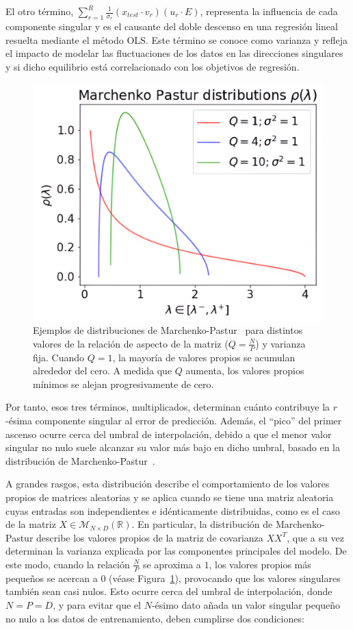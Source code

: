El otro término, $\sum_{r=1}^{R}\frac{1}{\sigma_r}(x_{test} \cdot v_r)(u_r \cdot E)$, representa la influencia de cada componente singular y es el causante del doble descenso en una regresión lineal resuelta mediante el método OLS. Este término se conoce como varianza y refleja el impacto de modelar las fluctuaciones de los datos en las direcciones singulares y si dicho equilibrio está correlacionado con los objetivos de regresión.

\begin{figure}[h]
    \centering
    \includegraphics[width=0.5\linewidth]{img/marchenku-pastor.png}
    \caption[Ejemplos de distribuciones de Marchenko-Pastur~\cite{Charles2018}.]{Ejemplos de distribuciones de Marchenko-Pastur~\cite{Charles2018} para distintos valores de la relación de aspecto de la matriz ($Q = \frac{N}{P}$) y varianza fija. Cuando $Q = 1$, la mayoría de valores propios se acumulan alrededor del cero. A medida que $Q$ aumenta, los valores propios mínimos se alejan progresivamente de cero.}\label{fig:marchenkopastur}
\end{figure}

Por tanto, esos tres términos, multiplicados, determinan cuánto contribuye la $r$-ésima componente singular al error de predicción. Además, el ``pico'' del primer ascenso ocurre cerca del umbral de interpolación, debido a que el menor valor singular no nulo suele alcanzar su valor más bajo en dicho umbral, basado en la distribución de Marchenko-Pastur~\cite{Marchenko1967}.

A grandes rasgos, esta distribución describe el comportamiento de los valores propios de matrices aleatorias y se aplica cuando se tiene una matriz aleatoria cuyas entradas son independientes e idénticamente distribuidas, como es el caso de la matriz $X \in \mathcal{M}_{N \times D}(\mathbb{R})$. En particular, la distribución de Marchenko-Pastur describe los valores propios de la matriz de covarianza $XX^{T}$, que a su vez determinan la varianza explicada por las componentes principales del modelo. De este modo, cuando la relación $\frac{N}{P}$ se aproxima a $1$, los valores propios más pequeños se acercan a $0$ (véase Figura~\ref{fig:marchenkopastur}), provocando que los valores singulares también sean casi nulos. Esto ocurre cerca del umbral de interpolación, donde $N = P = D$, y para evitar que el $N$-ésimo dato añada un valor singular pequeño no nulo a los datos de entrenamiento, deben cumplirse dos condiciones: 

